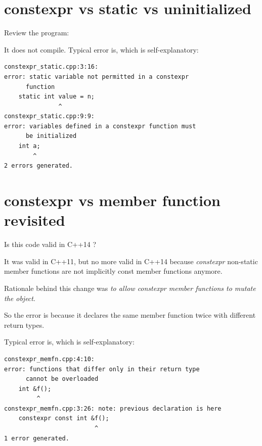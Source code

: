 \section{constexpr vs static vs uninitialized}

\begin{Exercise}[title={constexpr vs static vs uninitialized}, difficulty=2, label=ex021]
Review the program:

\end{Exercise}


\begin{Answer}[ref=ex021]
It does not compile. Typical error is, which is self-explanatory:
\begin{verbatim}
constexpr_static.cpp:3:16: 
error: static variable not permitted in a constexpr
      function
    static int value = n;         
               ^
constexpr_static.cpp:9:9: 
error: variables defined in a constexpr function must
      be initialized
    int a;                        
        ^
2 errors generated.
\end{verbatim}


\end{Answer}




\section{constexpr vs member function revisited}

\begin{Exercise}[title={constexpr vs member function revisited}, difficulty=2, label=ex022]
Is this code valid in C++14 ?

\end{Exercise}


\begin{Answer}[ref=ex022]
It was valid in C++11, but no more valid in C++14 because \emph{constexpr} non-static member functions are not implicitly const member functions anymore.

Rationale behind this change was \emph{to allow constexpr member functions to mutate the object}.

So the error is because it declares the same member function twice with different return types.

 Typical error is, which is self-explanatory:
\begin{verbatim}
constexpr_memfn.cpp:4:10: 
error: functions that differ only in their return type
      cannot be overloaded
    int &f();
         ^
constexpr_memfn.cpp:3:26: note: previous declaration is here
    constexpr const int &f();
                         ^
1 error generated.
\end{verbatim}


\end{Answer}




